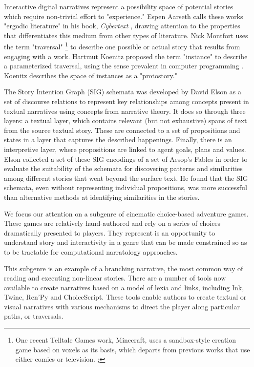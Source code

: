 \documentclass[10pt]{article}
\begin{document}
Interactive digital narratives represent a possibility space of
potential stories which require non-trivial effort to "experience."
Espen Aarseth calls these works "ergodic literature" in his book,
\emph{Cybertext} \cite{Aarseth1997}, drawing attention to the properties
that differentiates this medium from other types of literature. Nick
Montfort uses the term "traversal" \footnote{One recent Telltale Games work, Minecraft, uses a sandbox-style
creation game based on voxels as its basis, which departs from
previous works that use either comics or television.
;} to describe one possible or
actual story that results from engaging with a work. Hartmut Koenitz
proposed the term "instance" to describe a parameterized traversal,
using the sense prevalent in computer programming \cite{Hartmut2015}.
Koenitz describes the space of instances as a "protostory." 

The Story Intention Graph (SIG) schemata was developed by David Elson
as a set of discourse relations to represent key relationships among
concepts present in textual narratives using concepts from narrative
theory. It does so through three layers: a textual layer, which
contains relevant (but not exhaustive) spans of text from the source
textual story. These are connected to a set of propositions and states
in a layer that captures the described happenings. Finally, there is
an interpretive layer, where propositions are linked to agent goals,
plans and values. Elson collected a set of these SIG encodings of a
set of Aesop’s Fables in order to evaluate the suitability of the
schemata for discovering patterns and similarities among different
stories that went beyond the surface text. He found that the SIG
schemata, even without representing individual propositions, was more
successful than alternative methods at identifying similarities in the
stories.

We focus our attention on a subgenre of cinematic choice-based
adventure games. These games are relatively hand-authored and rely on
a series of choices dramatically presented to players. They represent
is an opportunity to understand story and interactivity in a genre
that can be made constrained so as to be tractable for computational
narratology approaches.

This subgenre is an example of a branching narrative, the most common
way of reading and executing non-linear stories. There are a number of
tools now available to create narratives based on a model of lexia and
links, including Ink, Twine, Ren'Py and ChoiceScript. These tools
enable authors to create textual or visual narratives with various
mechanisms to direct the player along particular paths, or traversals.
\end{document}

